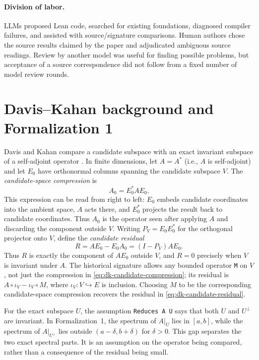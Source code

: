 \paragraph{Division of labor.}
LLMs proposed Lean code, searched for existing foundations, diagnosed compiler
failures, and assisted with source/signature comparisons.  Human authors chose
the source results claimed by the paper and adjudicated ambiguous source
readings.  Review by another model was useful for finding possible problems, but
acceptance of a source correspondence did not follow from a fixed number of
model review rounds.

\section{Davis--Kahan background and Formalization 1}
\label{app:formalization1}

Davis and Kahan compare a candidate subspace with an exact invariant
subspace of a self-adjoint operator \citep{davis1970rotation}.  In finite
dimensions, let $A=A^*$ (i.e., $A$ is self-adjoint) and let $E_0$ have
orthonormal columns spanning the candidate subspace $V$.  The
\emph{candidate-space compression} is
\begin{equation}
  A_0=E_0^*AE_0.
  \label{eq:dk-candidate-compression}
\end{equation}
This expression can be read from right to left: $E_0$ embeds candidate
coordinates into the ambient space, $A$ acts there, and $E_0^*$ projects the
result back to candidate coordinates.  Thus $A_0$ is the operator seen after
applying $A$ and discarding the component outside $V$.  Writing
$P_V=E_0E_0^*$ for the orthogonal projector onto $V$, define the
\emph{candidate residual}
\begin{equation}
  R=AE_0-E_0A_0=(I-P_V)AE_0.
  \label{eq:dk-candidate-residual}
\end{equation}
Thus $R$ is exactly the component of $AE_0$ outside $V$, and $R=0$ precisely
when $V$ is invariant under $A$.  The historical signature allows any bounded
operator \texttt{M} on $V$, not just the compression in
\cref{eq:dk-candidate-compression}; its residual is
$A\circ\iota_V-\iota_V\circ M$, where $\iota_V:V\hookrightarrow E$ is inclusion.
Choosing $M$ to be the corresponding candidate-space compression recovers
the residual in \cref{eq:dk-candidate-residual}.

For the exact subspace $U$, the assumption \texttt{Reduces A U} says that both
$U$ and $U^\perp$ are invariant.  In Formalization~1, the spectrum of $A|_U$
lies in $[a,b]$, while the spectrum of $A|_{U^\perp}$ lies outside
$(a-\delta,b+\delta)$ for $\delta>0$.  This gap separates the two exact spectral
parts.  It is an assumption on the operator being compared, rather than a
consequence of the residual being small.

